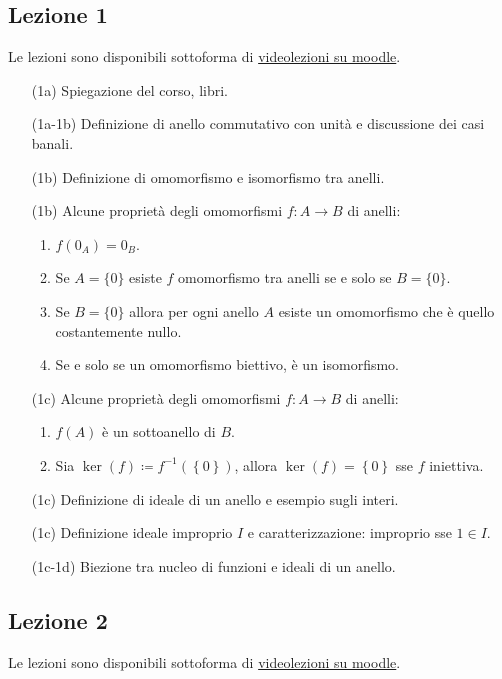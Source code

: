 \documentclass[italian]{article}
\begin{document}
    \subsection{Lezione 1}
    Le lezioni sono disponibili sottoforma di 
    \href{https://didatticaonline.unitn.it/dol/course/view.php?id=23268}{videolezioni
    su moodle}.
        \begin{enumerate}
          \item[(1a)] Spiegazione del corso, libri.
          \item[(1a-1b)] Definizione di anello commutativo con unità e discussione dei casi banali.
          \item[(1b)] Definizione di omomorfismo e isomorfismo tra anelli.
          \item[(1b)] Alcune proprietà degli omomorfismi $f \colon A \to B$ di anelli:
          	\begin{enumerate}
          		\item $f(0_A) = 0_B$.
          		\item Se $A = \{0\}$ esiste $f$ omomorfismo tra anelli se e solo se $B = \{0\}$.
          		\item Se $B = \{0\}$ allora per ogni anello $A$ esiste un omomorfismo che è quello 
          			costantemente nullo.
          		\item Se e solo se un omomorfismo biettivo, è un isomorfismo.
          	\end{enumerate}
          \item[(1c)] Alcune proprietà degli omomorfismi $f \colon A \to B$ 
            di anelli:
                \begin{enumerate}
                  \item $f(A)$ è un sottoanello di $B$.
                  \item Sia $\ker(f) \coloneqq f^{-1}(\left\{ 0 \right\})$,
                    allora $\ker(f) = \left\{ 0 \right\}$ sse $f$ iniettiva. 
                \end{enumerate}
          \item[(1c)] Definizione di ideale di un anello e esempio sugli interi.
          \item[(1c)] Definizione ideale improprio $I$  e caratterizzazione: improprio sse
            $1 \in I$.
          \item[(1c-1d)] Biezione tra nucleo di funzioni e ideali di un anello. 
        \end{enumerate}

    \subsection{Lezione 2}
    Le lezioni sono disponibili sottoforma di 
    \href{https://didatticaonline.unitn.it/dol/course/view.php?id=23268}{videolezioni
    su moodle}.
    
\end{document}
